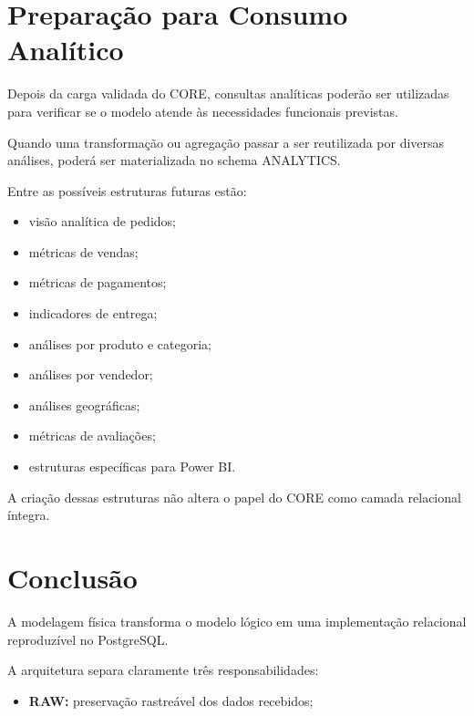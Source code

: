 \documentclass[12pt,a4paper]{article}
\begin{document}
{	%
	\section{Preparação para Consumo Analítico}
	
	Depois da carga validada do CORE, consultas analíticas poderão ser
	utilizadas para verificar se o modelo atende às necessidades
	funcionais previstas.
	
	Quando uma transformação ou agregação passar a ser reutilizada por
	diversas análises, poderá ser materializada no schema ANALYTICS.
	
	Entre as possíveis estruturas futuras estão:
	
	\begin{itemize}[leftmargin=1.2cm]
		\item visão analítica de pedidos;
		\item métricas de vendas;
		\item métricas de pagamentos;
		\item indicadores de entrega;
		\item análises por produto e categoria;
		\item análises por vendedor;
		\item análises geográficas;
		\item métricas de avaliações;
		\item estruturas específicas para Power BI.
	\end{itemize}
	
	A criação dessas estruturas não altera o papel do CORE como camada
	relacional íntegra.
	
	\section{Conclusão}
	
	A modelagem física transforma o modelo lógico em uma implementação
	relacional reproduzível no PostgreSQL.
	
	A arquitetura separa claramente três responsabilidades:
	
	\begin{itemize}[leftmargin=1.2cm]
		
		\item \textbf{RAW:}
		preservação rastreável dos dados recebidos;
		

\end{itemize}}
\end{document}

